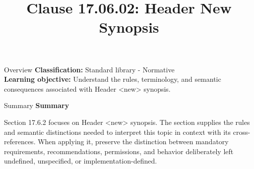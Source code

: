 \documentclass[10pt,letterpaper]{article}
\title{Clause 17.06.02: Header New Synopsis}
\author{}
\date{}
\begin{document}
\maketitle
\begin{CornellOverviewBox}{Overview}
\textbf{Classification:} Standard library - Normative\\[2pt]
\textbf{Learning objective:} Understand the rules, terminology, and semantic consequences associated with Header <new> synopsis.
\end{CornellOverviewBox}\begin{CornellSummaryBox}{Summary}
{\sffamily\bfseries\color{Accent} Summary}\par\vspace{3pt}Section 17.6.2 focuses on Header <new> synopsis. The section supplies the rules and semantic distinctions needed to interpret this topic in context with its cross-references. When applying it, preserve the distinction between mandatory requirements, recommendations, permissions, and behavior deliberately left undefined, unspecified, or implementation-defined.
\end{CornellSummaryBox}
\end{document}
